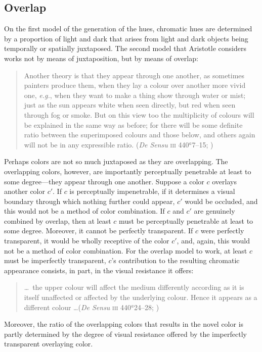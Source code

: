 
\subsection{Overlap} %
\label{sub:overlap}
On the first model of the generation of the hues, chromatic hues are determined by a proportion of light and dark that arises from light and dark objects being temporally or spatially juxtaposed. The second model that Aristotle considers works not by means of juxtaposition, but by means of overlap:
\begin{quote}
	Another theory is that they appear through one another, as sometimes painters produce them, when they lay a colour over another more vivid one, \emph{e.g.}, when they want to make a thing show through water or mist; just as the sun appears white when seen directly, but red when seen through fog or smoke. But on this view too the multiplicity of colours will be explained in the same way as before; for there will be some definite ratio between the superimposed colours and those below, and others again will not be in any expressible ratio. (\emph{De Sensu} \textsc{iii} 440\( ^{a} \)7--15; \citealt[235]{Hett:1936fk})
\end{quote}
Perhaps colors are not so much juxtaposed as they are overlapping. The overlapping colors, however, are importantly perceptually penetrable at least to some degree---they appear through one another. Suppose a color \( c \) overlays another color \( c' \). If \( c \) is perceptually impenetrable, if it determines a visual boundary through which nothing further could appear, \( c' \) would be occluded, and this would not be a method of color combination. If \( c \) and \( c' \) are genuinely combined by overlap, then at least \( c \) must be perceptually penetrable at least to some degree. Moreover, it cannot be perfectly transparent. If \( c \) were perfectly transparent, it would be wholly receptive of the color \( c' \), and, again, this would not be a method of color combination. For the overlap model to work, at least \( c \) must be imperfectly transparent, \( c \)'s contribution to the resulting chromatic appearance consists, in part, in the visual resistance it offers:
\begin{quote}
	\ldots\ the upper colour will affect the medium differently according as it is itself unaffected or affected by the underlying colour. Hence it appears as a different colour \ldots (\emph{De Sensu} \textsc{iii} 440\( ^{a} \)24--28; \citealt[235]{Hett:1936fk})
\end{quote}
Moreover, the ratio of the overlapping colors that results in the novel color is partly determined by the degree of visual resistance offered by the imperfectly transparent overlaying color.

